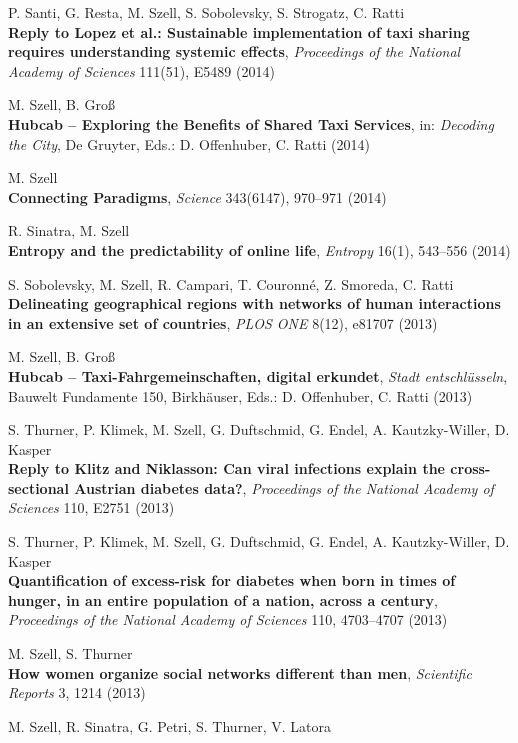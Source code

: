 \documentclass[10pt,a4paper]{article}
\begin{document}
\begin{etaremune}
\item P. Santi, G. Resta, M. Szell, S. Sobolevsky, S. Strogatz, C. Ratti\\
    \textbf{Reply to Lopez et al.: Sustainable implementation of taxi sharing requires understanding systemic effects}, \textit{Proceedings of the National Academy of Sciences} 111(51), E5489 (2014)
\item M. Szell, B. Gro{\ss}\\
    \textbf{Hubcab -- Exploring the Benefits of Shared Taxi Services}, in: \textit{Decoding the City}, De Gruyter, Eds.: D. Offenhuber, C. Ratti (2014)
\item M. Szell\\
    \textbf{Connecting Paradigms}, \textit{Science} 343(6147), 970--971 (2014)
\item R. Sinatra, M. Szell\\
    \textbf{Entropy and the predictability of online life}, \textit{Entropy} 16(1), 543--556 (2014)
\item S. Sobolevsky, M. Szell, R. Campari, T. Couronn\'e, Z. Smoreda, C. Ratti\\
    \textbf{Delineating geographical regions with networks of human interactions in an extensive set of countries}, \textit{PLOS ONE} 8(12), e81707 (2013)
\item M. Szell, B. Gro{\ss}\\
    \textbf{Hubcab -- Taxi-Fahrgemeinschaften, digital erkundet}, \textit{Stadt entschl\"usseln}, Bauwelt Fundamente 150, Birkh\"auser, Eds.: D. Offenhuber, C. Ratti (2013)
\item S. Thurner, P. Klimek, M. Szell, G. Duftschmid, G. Endel, A. Kautzky-Willer, D. Kasper\\
    \textbf{Reply to Klitz and Niklasson: Can viral infections explain the cross-sectional Austrian diabetes data?}, \textit{Proceedings of the National Academy of Sciences} 110, E2751 (2013)
\item S. Thurner, P. Klimek, M. Szell, G. Duftschmid, G. Endel, A. Kautzky-Willer, D. Kasper\\
    \textbf{Quantification of excess-risk for diabetes when born in times of hunger, in an entire population of a nation, across a century}, \textit{Proceedings of the National Academy of Sciences} 110, 4703--4707 (2013)
\item M. Szell, S. Thurner\\
    \textbf{How women organize social networks different than men}, \textit{Scientific Reports} 3, 1214 (2013)
\item M. Szell, R. Sinatra, G. Petri, S. Thurner, V. Latora\\

\end{etaremune}
\end{document}
